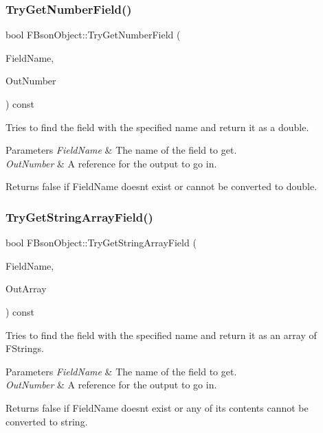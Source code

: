 \subsubsection{\texorpdfstring{Try\+Get\+Number\+Field()}{TryGetNumberField()}}
{\footnotesize\ttfamily bool F\+Bson\+Object\+::\+Try\+Get\+Number\+Field (\begin{DoxyParamCaption}\item[{const F\+String \&}]{Field\+Name,  }\item[{double \&}]{Out\+Number }\end{DoxyParamCaption}) const}

Tries to find the field with the specified name and return it as a double.


\begin{DoxyParams}{Parameters}
{\em Field\+Name} & The name of the field to get. \\
\hline
{\em Out\+Number} & A reference for the output to go in. \\
\hline
\end{DoxyParams}
\begin{DoxyReturn}{Returns}
false if Field\+Name doesn\textquotesingle{}t exist or cannot be converted to double. 
\end{DoxyReturn}
\mbox{\label{class_f_bson_object_aeca0635a47dd5b5add74b80672c73516}} 
\subsubsection{\texorpdfstring{Try\+Get\+String\+Array\+Field()}{TryGetStringArrayField()}}
{\footnotesize\ttfamily bool F\+Bson\+Object\+::\+Try\+Get\+String\+Array\+Field (\begin{DoxyParamCaption}\item[{const F\+String \&}]{Field\+Name,  }\item[{T\+Array$<$ F\+String $>$ \&}]{Out\+Array }\end{DoxyParamCaption}) const}

Tries to find the field with the specified name and return it as an array of F\+Strings.


\begin{DoxyParams}{Parameters}
{\em Field\+Name} & The name of the field to get. \\
\hline
{\em Out\+Number} & A reference for the output to go in. \\
\hline
\end{DoxyParams}
\begin{DoxyReturn}{Returns}
false if Field\+Name doesn\textquotesingle{}t exist or any of its contents cannot be converted to string. 
\end{DoxyReturn}
\mbox{\label{class_f_bson_object_a3424002e68cf2e9928c038e3d7a4aec9}} 
